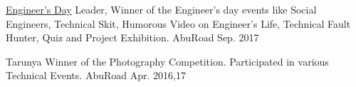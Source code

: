 \begin{cvhonors}
	
  \cvhonor
	{\href{https://www.facebook.com/citabuinfo/posts/1229195450520361}{Engineer's Day}}%
	{Leader, Winner of the Engineer's day events like Social Engineers, Technical Skit, Humorous Video on Engineer’s Life, Technical Fault Hunter, Quiz and Project Exhibition.} %
	{AbuRoad} %
	{Sep. 2017} %
	
  \cvhonor
	{Tarunya} %
	{Winner of the Photography Competition. Participated in various Technical Events.} %
	{AbuRoad} %
	{Apr. 2016,17} %
	
\end{cvhonors}
